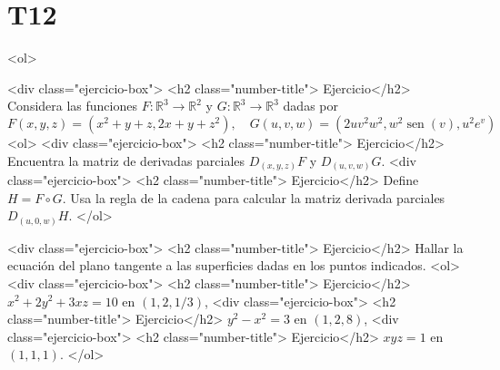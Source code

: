 \documentclass{article}
\theoremstyle{definition}
\newcommand{\sen}{\operatorname{sen}}
\begin{document}
  \section*{T12 }
  <ol>
  

    
  <div class="ejercicio-box"> <h2 class="number-title"> Ejercicio</h2> Considera las funciones $F:\mathbb{R}^3\to \mathbb{R}^2$ y $G:\mathbb{R}^3\to \mathbb{R}^3$ dadas
    por
    $$
    F(x,y,z)=(x^2+y+z, 2x+y+z^2), \quad G(u,v,w)=(2uv^2w^2,w^2\sen(v),u^2e^v)
    $$
    <ol>
    <div class="ejercicio-box"> <h2 class="number-title"> Ejercicio</h2> Encuentra la matriz de derivadas parciales $D_{(x,y,z)}F$ y $D_{(u,v,w)}G$.
    <div class="ejercicio-box"> <h2 class="number-title"> Ejercicio</h2> Define $H=F\circ G$. Usa la regla de la cadena para calcular la matriz derivada
      parciales $D_{(u,0,w)}H$.
    </ol>


    
  <div class="ejercicio-box"> <h2 class="number-title"> Ejercicio</h2> Hallar la ecuación del plano tangente a las superficies
    dadas en los puntos indicados.
    <ol>
    <div class="ejercicio-box"> <h2 class="number-title"> Ejercicio</h2> $x^2+2y^2+3xz=10$ en $(1,2,1/3)$,
    <div class="ejercicio-box"> <h2 class="number-title"> Ejercicio</h2> $y^2-x^2=3$ en $(1,2,8)$,
    <div class="ejercicio-box"> <h2 class="number-title"> Ejercicio</h2> $xyz=1$ en $(1,1,1)$.
    </ol>




\end{document}
